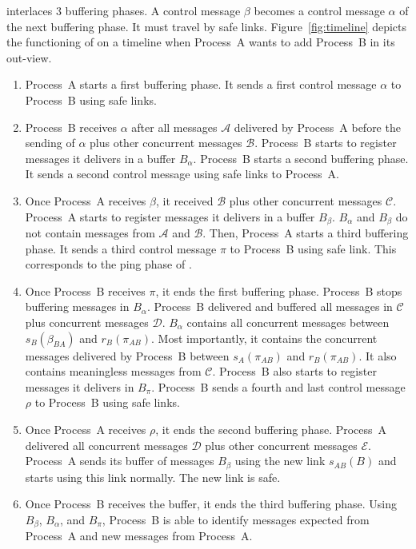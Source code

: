 \RPCBROADCAST interlaces 3 buffering phases. A control message $\beta$ becomes a
control message $\alpha$ of the next buffering phase. It must travel by safe
links. Figure~\ref{fig:timeline} depicts the functioning of \RPCBROADCAST on a
timeline when Process~A wants to add Process~B in its out-view. 
\begin{enumerate}[leftmargin=*]
\item Process~A starts a first buffering phase. It sends a first control message
  $\alpha$ to Process~B using safe links. 
\item Process~B receives $\alpha$ after all messages $\mathcal{A}$ delivered by
  Process~A before the sending of $\alpha$ plus other concurrent messages
  $\mathcal{B}$.  Process~B starts to register messages it delivers in a buffer
  $B_\alpha$.  Process~B starts a second buffering phase. It sends a second
  control message using safe links to Process~A.
\item Once Process~A receives $\beta$, it received $\mathcal{B}$ plus other
  concurrent messages $\mathcal{C}$. Process~A starts to register messages it
  delivers in a buffer $B_\beta$. $B_\alpha$ and $B_\beta$ do not contain messages from
  $\mathcal{A}$ and $\mathcal{B}$.
  Then, Process~A starts a third buffering phase. It sends a third control
  message $\pi$ to Process~B using safe link. This corresponds to the ping phase
  of \PCBROADCAST.
\item Once Process~B receives $\pi$, it ends the first buffering phase.
  Process~B stops buffering messages in $B_\alpha$. Process~B delivered and
  buffered all messages in $\mathcal{C}$ plus concurrent messages
  $\mathcal{D}$. $B_\alpha$ contains all concurrent messages between
  $s_B(\beta_{BA})$ and $r_B(\pi_{AB})$. Most importantly, it contains the
  concurrent messages delivered by Process~B between $s_A(\pi_{AB})$ and
  $r_B(\pi_{AB})$. It also contains meaningless messages from $\mathcal{C}$.
  Process~B also starts to register messages it delivers in $B_\pi$.
  Process~B sends a fourth and last control message $\rho$ to Process~B
  using safe links. 
\item Once Process~A receives $\rho$, it ends the second buffering
  phase. Process~A delivered all concurrent messages $\mathcal{D}$ plus other
  concurrent messages $\mathcal{E}$. Process~A sends its buffer of messages $B_\beta$
  using the new link $s_{AB}(B)$ and starts using this link normally. The new
  link is safe.
\item Once Process~B receives the buffer, it ends the third buffering
  phase. Using $B_\beta$, $B_\alpha$, and $B_\pi$, Process~B is able to identify
  messages expected from Process~A and new messages from Process~A.


\end{enumerate}
